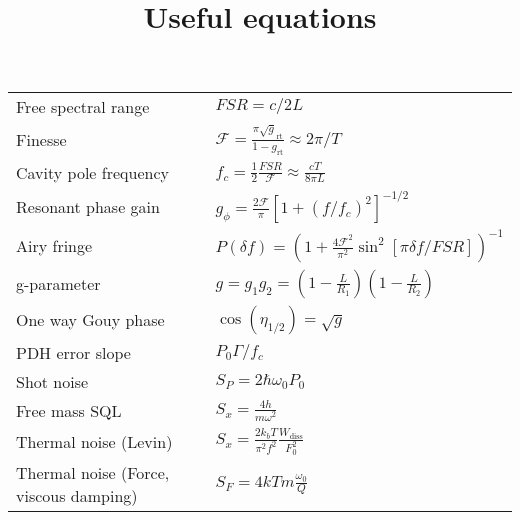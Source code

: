 \documentclass{article}
\begin{document}
\title{Useful equations}
\maketitle

\Large
\begin{tabular}{p{2in}p{4in}}
  Free spectral range & $FSR = c/2 L$\\
  Finesse & $ \mathcal{F} = \frac{\pi \sqrt g_{\mathrm{rt}}}{1-g_{\mathrm{rt}}} \approx 2 \pi/ T$ \\
  Cavity pole frequency & $f_c = \frac{1}{2}\frac{FSR}{\mathcal{F}} \approx \frac{cT}{8\pi L}$\\
  Resonant phase gain & $g_\phi = \frac{2 \mathcal{F}}{\pi}\left[1+\left(f/f_c\right)^2\right]^{-1/2}$\\
  Airy fringe & $P(\delta f) = \left (1 + \frac{4 \mathcal{F}^2}{\pi^2} \sin^2 [
  \pi \delta f / FSR ] \right)^{-1} $ \\
  g-parameter & $g = g_1g_2 = (1 - \frac{L}{R_1})(1 - \frac{L}{R_2})$ \\
  One way Gouy phase & $\cos(\eta_{1/2}) = \sqrt g$ \\
  PDH error slope  & $P_0 \Gamma / f_c$\\
  Shot noise & $S_P = 2\hbar \omega_0 P_0$\\
  Free mass SQL & $S_x = \frac{4 h}{m \omega^2}$\\
  Thermal noise (Levin) &  $S_x = \frac{2k_bT}{\pi^2f^2}\frac{W_{\mathrm{diss}}}{F_0^2}$\\
  Thermal noise (Force, viscous damping) & $S_F = 4kTm\frac{\omega_0}{Q}$\\

\end{tabular}
\end{document}
